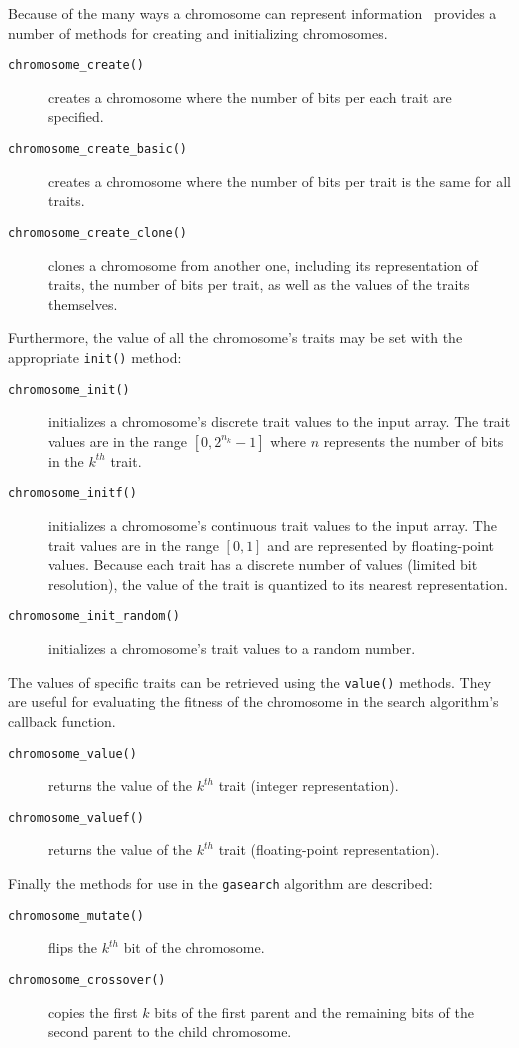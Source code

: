 Because of the many ways a chromosome can represent information \liquid\
provides a number of methods for creating and initializing chromosomes.
%
\begin{description}
\item[{\tt chromosome\_create()}]
    creates a chromosome where the number of bits per each trait are
    specified.
\item[{\tt chromosome\_create\_basic()}]
    creates a chromosome where the number of bits per trait is the same
    for all traits.
\item[{\tt chromosome\_create\_clone()}]
    clones a chromosome from another one, including its representation
    of traits, the number of bits per trait, as well as the values of
    the traits themselves.
\end{description}
%
Furthermore, the value of all the chromosome's traits may be set with
the appropriate {\tt init()} method:
%
\begin{description}
\item[{\tt chromosome\_init()}]
    initializes a chromosome's discrete trait values to the input array.
    The trait values are in the range $[0,2^{n_k}-1]$ where $n$
    represents the number of bits in the $k^{th}$ trait.
\item[{\tt chromosome\_initf()}]
    initializes a chromosome's continuous trait values to the input
    array.
    The trait values are in the range $[0,1]$ and are represented by
    floating-point values.
    Because each trait has a discrete number of values (limited bit
    resolution), the value of the trait is quantized to its nearest
    representation.
\item[{\tt chromosome\_init\_random()}]
    initializes a chromosome's trait values to a random number.
\end{description}
%
The values of specific traits can be retrieved using the {\tt value()}
methods.
They are useful for evaluating the fitness of the chromosome in the
search algorithm's callback function.
%
\begin{description}
\item[{\tt chromosome\_value()}]
    returns the value of the $k^{th}$ trait (integer representation).
\item[{\tt chromosome\_valuef()}]
    returns the value of the $k^{th}$ trait (floating-point representation).
\end{description}
%
Finally the methods for use in the {\tt gasearch} algorithm are
described:
%
\begin{description}
\item[{\tt chromosome\_mutate()}]
    flips the $k^{th}$ bit of the chromosome.
\item[{\tt chromosome\_crossover()}]
    copies the first $k$ bits of the first parent and the remaining bits
    of the second parent to the child chromosome.
\end{description}
%

